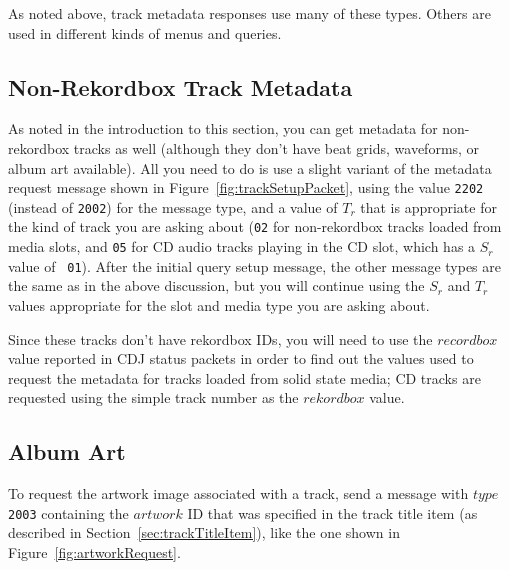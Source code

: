 \documentclass[11pt]{article}
\begin{document}
As noted above, track metadata responses use many of these types.
Others are used in different kinds of menus and queries.

\subsection{Non-Rekordbox Track Metadata}
\label{sec:nonRekordboxMetadata}

As noted in the introduction to this section, you can get metadata for
non-rekordbox tracks as well (although they don't have beat grids,
waveforms, or album art available). All you need to do is use a slight
variant of the metadata request message shown in
Figure~\ref{fig:trackSetupPacket}, using the value {\tt 2202} (instead
of {\tt 2002}) for the message type, and a value of $T_r$ that is
appropriate for the kind of track you are asking about ({\tt 02} for
non-rekordbox tracks loaded from media slots, and {\tt 05} for CD
audio tracks playing in the CD slot, which has a $S_r$ value of {\tt
  01}). After the initial query setup message, the other message types
are the same as in the above discussion, but you will continue using
the $S_r$ and $T_r$ values appropriate for the slot and media type you
are asking about.

Since these tracks don't have rekordbox IDs, you will need to use the
$recordbox$ value reported in CDJ status packets in order to find out
the values used to request the metadata for tracks loaded from solid
state media; CD tracks are requested using the simple track number as
the $rekordbox$ value.

\subsection{Album Art}
\label{sec:albumArt}

To request the artwork image associated with a track, send a message
with $type$ {\tt 2003} containing the $artwork$ ID that was
specified in the track title item (as described in
Section~\ref{sec:trackTitleItem}), like the one shown in
Figure~\ref{fig:artworkRequest}.
\end{document}
